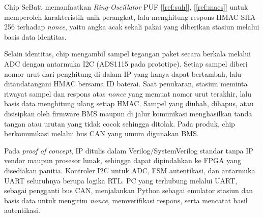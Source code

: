 \documentclass[11pt,a4paper]{article}
\newcommand{\rujuk}[1]{[\ref{#1}]}   %
\begin{document}
Chip SeBatt memanfaatkan \textit{Ring-Oscillator} PUF \rujuk{ref:suh}, \rujuk{ref:maes} untuk memperoleh karakteristik unik perangkat, lalu menghitung respons HMAC-SHA-256 terhadap \textit{nonce}, yaitu angka acak sekali pakai yang diberikan stasiun melalui basis data identitas.

Selain identitas, chip mengambil sampel tegangan paket secara berkala melalui ADC dengan antarmuka I2C (ADS1115 pada prototipe). Setiap sampel diberi nomor urut dari penghitung di dalam IP yang hanya dapat bertambah, lalu ditandatangani HMAC bersama ID baterai. Saat penukaran, stasiun meminta riwayat sampel dan respons atas \textit{nonce} yang memuat nomor urut terakhir, lalu basis data menghitung ulang setiap HMAC. Sampel yang diubah, dihapus, atau disisipkan oleh firmware BMS maupun di jalur komunikasi menghasilkan tanda tangan atau urutan yang tidak cocok sehingga ditolak. Pada produk, chip berkomunikasi melalui bus CAN yang umum digunakan BMS.

Pada \textit{proof of concept}, IP ditulis dalam Verilog/SystemVerilog standar tanpa IP vendor maupun prosesor lunak, sehingga dapat dipindahkan ke FPGA yang disediakan panitia. Kontroler I2C untuk ADC, FSM autentikasi, dan antarmuka UART seluruhnya berupa logika RTL. PC yang terhubung melalui UART, sebagai pengganti bus CAN, menjalankan Python sebagai emulator stasiun dan basis data untuk mengirim \textit{nonce}, memverifikasi respons, serta mencatat hasil autentikasi.
\end{document}
